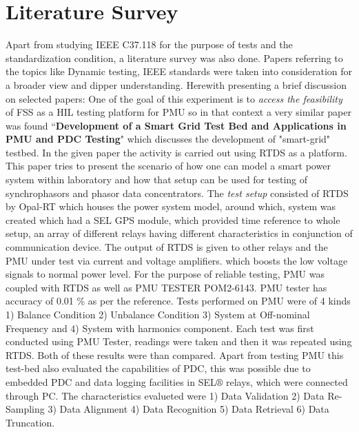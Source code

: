 \section{Literature Survey}

Apart from studying IEEE C37.118 for the purpose of tests and the standardization condition, a literature survey was also done. Papers referring to the topics like Dynamic testing, IEEE standards were taken into consideration for a broader view and dipper understanding. Herewith presenting a brief discussion on selected papers:
One of the goal of this experiment is to \textit{access the feasibility} of FSS as a HIL testing platform for PMU so in that context a very similar paper was found ``\textbf{Development of a Smart Grid Test Bed and Applications in PMU and PDC Testing}"  which discusses the development of "smart-grid" testbed. In the given paper the activity is carried out using RTDS as a platform. This paper tries to present the scenario of how one can model a smart power system within laboratory and how that setup can be used for testing of synchrophasors and phasor data concentrators. The \textit{test setup} consisted of RTDS by Opal-RT which houses the power system model, around which, system was created which had a SEL GPS module, which provided time reference to whole setup, an array of different relays having different characteristics in conjunction of communication device. The output of RTDS is given to other relays and the PMU under test via current and voltage amplifiers. which boosts the low voltage signals to normal power level. For the purpose of reliable testing, PMU was coupled with RTDS as well as PMU TESTER POM2-6143\cite{Paper:saugata}. PMU tester has accuracy of 0.01 \% as per the reference. Tests performed on PMU were of 4 kinds 1) Balance Condition 2) Unbalance Condition 3) System at Off-nominal Frequency and 4) System with harmonics component. Each test was first conducted using PMU Tester, readings were taken and then it was repeated using RTDS. Both of these results were than compared. Apart from testing PMU this test-bed also evaluated the capabilities of PDC, this was possible due to embedded PDC and data logging facilities in SEL$\circledR$ relays, which were connected through PC. The characteristics evalueted were 1) Data Validation 2) Data Re-Sampling 3) Data Alignment 4) Data Recognition 5) Data Retrieval 6) Data Truncation.


